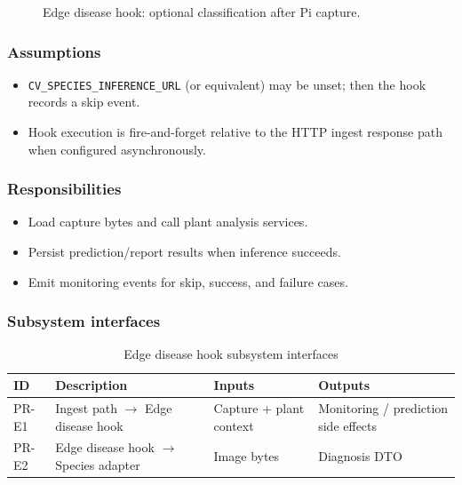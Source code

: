 \begin{figure}[H]
\centering
{}
\caption{Edge disease hook: optional classification after Pi capture.}
\label{fig:proc-edge-disease}
\end{figure}

\subsubsection{Assumptions}
\begin{itemize}
  \item \texttt{CV\_SPECIES\_INFERENCE\_URL} (or equivalent) may be unset; then the hook records a skip event.
  \item Hook execution is fire-and-forget relative to the HTTP ingest response path when configured asynchronously.
\end{itemize}

\subsubsection{Responsibilities}
\begin{itemize}
  \item Load capture bytes and call plant analysis services.
  \item Persist prediction/report results when inference succeeds.
  \item Emit monitoring events for skip, success, and failure cases.
\end{itemize}

\subsubsection{Subsystem interfaces}
\begin{table}[H]
\centering
\small
\begin{tabular}{|p{0.9cm}|p{3.4cm}|p{3.0cm}|p{3.5cm}|}
\hline
\textbf{ID} & \textbf{Description} & \textbf{Inputs} & \textbf{Outputs} \\
\hline
PR-E1 & Ingest path $\rightarrow$ Edge disease hook & Capture + plant context & Monitoring / prediction side effects \\
\hline
PR-E2 & Edge disease hook $\rightarrow$ Species adapter & Image bytes & Diagnosis DTO \\
\hline
\end{tabular}
\caption{Edge disease hook subsystem interfaces}
\end{table}

